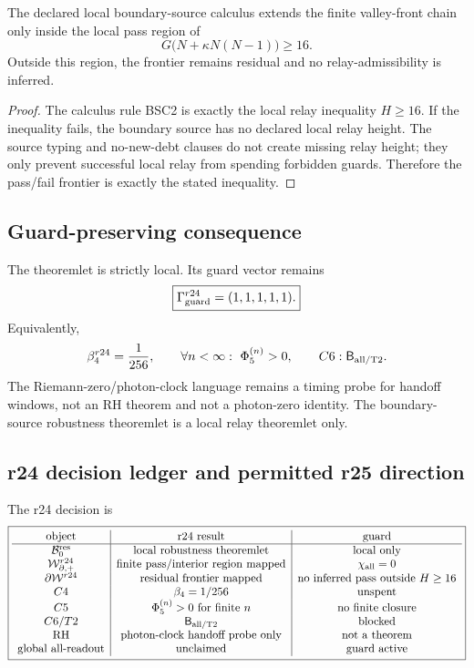 \begin{proposition}
\label{prop:v470-r24-residual-frontier-decision}
The declared local boundary-source calculus extends the finite valley-front
chain only inside the local pass region of
\[
G\bigl(N+\kappa N(N-1)\bigr)\geq16.
\]
Outside this region, the frontier remains residual and no relay-admissibility is
inferred.
\end{proposition}

\begin{proof}
The calculus rule BSC2 is exactly the local relay inequality \(H\geq16\).
If the inequality fails, the boundary source has no declared local relay height.
The source typing and no-new-debt clauses do not create missing relay height;
they only prevent successful local relay from spending forbidden guards.
Therefore the pass/fail frontier is exactly the stated inequality.
\end{proof}

\subsection{Guard-preserving consequence}
\label{subsec:v470-r24-guard-preserving-consequence}

The theoremlet is strictly local.  Its guard vector remains
\[
\boxed{
\Gamma_{\rm guard}^{r24}=(1,1,1,1,1).
}
\]
Equivalently,
\[
\beta_4^{r24}=\frac1{256},
\qquad
\forall n<\infty:\ \Phi_5^{(n)}>0,
\qquad
C6:\mathsf B_{\rm all/T2}.
\]
The Riemann-zero/photon-clock language remains a timing probe for handoff
windows, not an RH theorem and not a photon-zero identity.  The boundary-source
robustness theoremlet is a local relay theoremlet only.

\subsection{r24 decision ledger and permitted r25 direction}
\label{subsec:v470-r24-decision-ledger}

The r24 decision is
\[
\boxed{
\begin{array}{c|c|c}
\text{object} & \text{r24 result} & \text{guard}\\
\hline
\mathcal B_0^{\rm res} & \text{local robustness theoremlet} & \text{local only}\\
\mathcal W_{\partial,+}^{r24} & \text{finite pass/interior region mapped} & \chi_{\rm all}=0\\
\partial\mathcal W^{r24} & \text{residual frontier mapped} & \text{no inferred pass outside }H\geq16\\
C4 & \beta_4=1/256 & \text{unspent}\\
C5 & \Phi_5^{(n)}>0\text{ for finite }n & \text{no finite closure}\\
C6/T2 & \mathsf B_{\rm all/T2} & \text{blocked}\\
\text{RH} & \text{photon-clock handoff probe only} & \text{not a theorem}\\
\text{global all-readout} & \text{unclaimed} & \text{guard active}
\end{array}
}
\]

